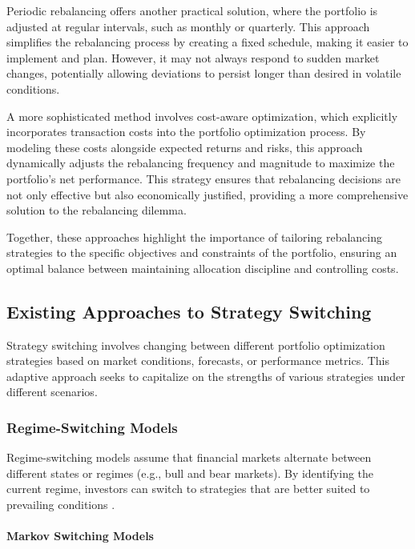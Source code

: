 Periodic rebalancing offers another practical solution, where the portfolio is adjusted at regular intervals, such as monthly or quarterly. This approach simplifies the rebalancing process by creating a fixed schedule, making it easier to implement and plan. However, it may not always respond to sudden market changes, potentially allowing deviations to persist longer than desired in volatile conditions.

A more sophisticated method involves cost-aware optimization, which explicitly incorporates transaction costs into the portfolio optimization process. By modeling these costs alongside expected returns and risks, this approach dynamically adjusts the rebalancing frequency and magnitude to maximize the portfolio’s net performance. This strategy ensures that rebalancing decisions are not only effective but also economically justified, providing a more comprehensive solution to the rebalancing dilemma.

Together, these approaches highlight the importance of tailoring rebalancing strategies to the specific objectives and constraints of the portfolio, ensuring an optimal balance between maintaining allocation discipline and controlling costs.

\subsection{Existing Approaches to Strategy Switching}

Strategy switching involves changing between different portfolio optimization strategies based on market conditions, forecasts, or performance metrics. This adaptive approach seeks to capitalize on the strengths of various strategies under different scenarios.

\subsubsection{Regime-Switching Models}

Regime-switching models assume that financial markets alternate between different states or regimes (e.g., bull and bear markets). By identifying the current regime, investors can switch to strategies that are better suited to prevailing conditions \cite{ang2002regime}.

\paragraph{Markov Switching Models}

